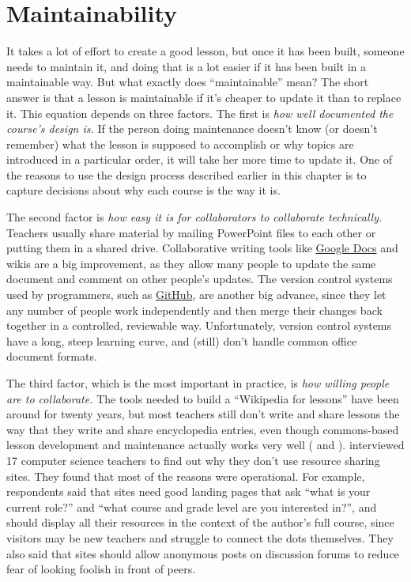 \section{Maintainability}\label{s:process-maintainability}

It takes a lot of effort to create a good lesson, but once it has been
built, someone needs to maintain it, and doing that is a lot easier if
it has been built in a maintainable way.  But what exactly does
``maintainable'' mean? The short answer is that a lesson is
maintainable if it's cheaper to update it than to replace it.  This
equation depends on three factors.  The first is \emph{how well
  documented the course's design is.} If the person doing maintenance
doesn't know (or doesn't remember) what the lesson is supposed to
accomplish or why topics are introduced in a particular order, it will
take her more time to update it. One of the reasons to use the design
process described earlier in this chapter is to capture decisions
about why each course is the way it is.

The second factor is \emph{how easy it is for collaborators to
  collaborate technically.}  Teachers usually share material by
mailing PowerPoint files to each other or putting them in a shared
drive. Collaborative writing tools like
\href{http://docs.google.com}{Google Docs} and wikis are a big
improvement, as they allow many people to update the same document and
comment on other people's updates. The version control systems used by
programmers, such as \href{http://github.com}{GitHub}, are another big
advance, since they let any number of people work independently and
then merge their changes back together in a controlled, reviewable
way. Unfortunately, version control systems have a long, steep
learning curve, and (still) don't handle common office document
formats.

The third factor, which is the most important in practice, is
\emph{how willing people are to collaborate.}  The tools needed to
build a ``Wikipedia for lessons'' have been around for twenty years,
but most teachers still don't write and share lessons the way that
they write and share encyclopedia entries, even though commons-based
lesson development and maintenance actually works very well
( and ).
\cite{Leak2017} interviewed 17 computer science teachers to find out
why they don't use resource sharing sites.  They found that most of
the reasons were operational.  For example, respondents said that
sites need good landing pages that ask ``what is your current role?''
and ``what course and grade level are you interested in?'', and should
display all their resources in the context of the author's full
course, since visitors may be new teachers and struggle to connect the
dots themselves.  They also said that sites should allow anonymous
posts on discussion forums to reduce fear of looking foolish in front
of peers.

